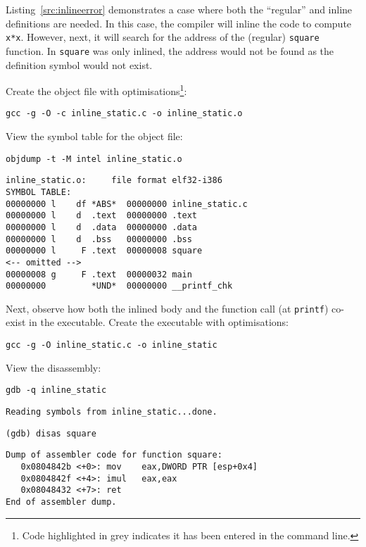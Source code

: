 \documentclass[a4paper]{article}
\begin{document}
Listing~\ref{src:inlineerror} demonstrates a case where both the ``regular'' and inline definitions are needed. In this case, the compiler will inline the code to compute \texttt{x*x}. However, next, it will search for the address of the (regular) \texttt{square} function. In \texttt{square} was only inlined, the address would not be found as the definition symbol would not exist.

Create the object file with optimisations\footnote{Code highlighted in grey indicates it has been entered in the command line.}:
\begin{lstlisting}[style=terminal]
gcc -g -O -c inline_static.c -o inline_static.o
\end{lstlisting}
View the symbol table for the object file:
\begin{lstlisting}[style=terminal]
objdump -t -M intel inline_static.o
\end{lstlisting}
\begin{verbatim}
inline_static.o:     file format elf32-i386
SYMBOL TABLE:
00000000 l    df *ABS*	00000000 inline_static.c
00000000 l    d  .text	00000000 .text
00000000 l    d  .data	00000000 .data
00000000 l    d  .bss	00000000 .bss
00000000 l     F .text	00000008 square
<-- omitted -->
00000008 g     F .text	00000032 main
00000000         *UND*	00000000 __printf_chk
\end{verbatim}
Next, observe how both the inlined body and the function call (at \texttt{printf}) co-exist in the executable. Create the executable with optimisations:
\begin{lstlisting}[style=terminal]
gcc -g -O inline_static.c -o inline_static
\end{lstlisting}
View the disassembly:
\begin{lstlisting}[style=terminal]
gdb -q inline_static 
\end{lstlisting}
\begin{verbatim}
Reading symbols from inline_static...done.   
\end{verbatim}
\begin{lstlisting}[style=terminal]
(gdb) disas square
\end{lstlisting}
\begin{verbatim}
Dump of assembler code for function square:
   0x0804842b <+0>:	mov    eax,DWORD PTR [esp+0x4]
   0x0804842f <+4>:	imul   eax,eax
   0x08048432 <+7>:	ret    
End of assembler dump.
\end{verbatim}
\end{document}

